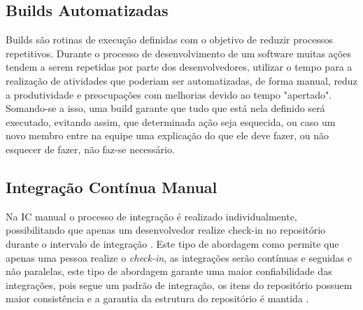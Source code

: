 \subsection{Builds Automatizadas}
Builds são rotinas de execução definidas com o objetivo de reduzir processos repetitivos. Durante o processo de desenvolvimento de um software muitas ações tendem a serem repetidas por parte dos desenvolvedores, utilizar o tempo para a realização  de atividades que poderiam ser automatizadas, de forma manual, reduz a produtividade e preocupações com melhorias devido ao tempo "apertado". Somando-se a isso, uma build garante que tudo que está nela definido será executado, evitando assim, que determinada ação seja esquecida, ou caso um novo membro entre na equipe uma explicação do que ele deve fazer, ou não esquecer de fazer, não faz-se necessário.

\subsection{Integração Contínua Manual}
Na IC manual o processo de integração é realizado individualmente, possibilitando que 
apenas um desenvolvedor realize check-in no repositório durante o intervalo de integração . Este tipo de abordagem como permite que apenas uma pessoa realize o \textit{check-in}, as integrações serão contínuas e seguidas e não paralelas, este tipo de abordagem garante uma maior confiabilidade das integrações, pois segue um padrão de integração, os itens do repositório possuem maior consistência e a garantia da estrutura do repositório é mantida \cite{gleiph2011}.


